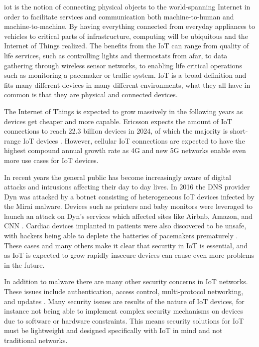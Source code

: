 \documentclass[0-thesis.tex]{subfiles}
\begin{document}
\gls{iot} is the notion of connecting physical objects to the
world-spanning Internet in order to facilitate services and communication both
machine-to-human and machine-to-machine. By having everything connected from everyday
appliances to vehicles to critical parts of infrastructure, computing will be ubiquitous
and the Internet of Things realized. The benefits from the IoT can range from quality of
life services, such as controlling lights and thermostats from afar, to data gathering
through wireless sensor networks, to enabling life critical operations such as monitoring
a pacemaker or traffic system. IoT is a broad definition and fits many different devices
in many different environments, what they all have in common is that they are physical and
connected devices.

The Internet of Things is expected to grow massively in the following years as devices get
cheaper and more capable. Ericsson expects the amount of IoT connections to reach 22.3
billion devices in 2024, of which the majority is short-range IoT devices
\parencite{ericsson-mobility-report}. However, cellular IoT connections are expected to
have the highest compound annual growth rate as 4G and new 5G networks enable even more
use cases for IoT devices.

In recent years the general public has become increasingly aware of digital attacks and
intrusions affecting their day to day lives. In 2016 the DNS provider Dyn was attacked by
a botnet consisting of heterogeneous IoT devices infected by the Mirai malware. Devices
such as printers and baby monitors were leveraged to launch an attack on Dyn's services
which affected sites like Airbnb, Amazon, and CNN \parencite{perlroth_2016}. Cardiac
devices implanted in patients were also discovered to be unsafe, with hackers being able
to deplete the batteries of pacemakers prematurely \parencite{hern_2017}. These cases and
many others make it clear that security in IoT is essential, and as IoT is expected to
grow rapidly insecure devices can cause even more problems in the future.

In addition to malware there are many other security concerns in IoT networks. These
issues include authentication, access control, multi-protocol networking, and updates
\parencite{jing2014, hossain2015, alrawais2017}. Many security issues are results of the
nature of IoT devices, for instance not being able to implement complex security
mechanisms on devices due to software or hardware constraints. This means security
solutions for IoT must be lightweight and designed specifically with IoT in mind and not
traditional networks.
\end{document}
